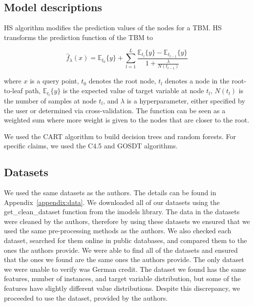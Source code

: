 \subsection{Model descriptions}

HS algorithm modifies the prediction values of the nodes for a TBM. HS transforms the prediction function of the TBM to

\begin{equation}
    \hat f_{\lambda}(x) = \mathbb{E}_{t_{0}}\{y\} + \sum_{l=1}^{L}\frac{\mathbb{E}_{t_{l}}\{y\}-\mathbb{E}_{t_{l-1}}\{y\}}{1+\frac{\lambda}{N(t_{l-1})}}
\end{equation}

where $ x $ is a query point, $ t_{0} $ denotes the root node, $ t_{l} $ denotes a node in the root-to-leaf path, $ \mathbb{E}_{t_{l}}\{y\} $ is the expected value of target variable at node $ t_{l} $, $ N(t_{l}) $ is the number of samples at node $ t_{l} $, and $ \lambda $ is a hyperparameter, either specified by the user or determined via cross-validation. The function can be seen as a weighted sum where more weight is given to the nodes that are closer to the root.

We used the CART algorithm to build decision trees and random forests. For specific claims, we used the C4.5 and GOSDT algorithms.

\subsection{Datasets}

We used the same datasets as the authors. The details can be found in Appendix~\ref{appendix:data}. We downloaded all of our datasets using the {\sf get\_clean\_dataset} function from the {\sf imodels} library. The data in the datasets were cleaned by the authors, therefore by using these datasets we ensured that we used the same pre-processing methods as the authors. We also checked each dataset, searched for them online in public databases, and compared them to the ones the authors provide. We were able to find all of the datasets and ensured that the ones we found are the same ones the authors provide. The only dataset we were unable to verify was German credit. The dataset we found has the same features, number of instances, and target variable distribution, but some of the features have slightly different value distributions. Despite this discrepancy, we proceeded to use the dataset, provided by the authors.

